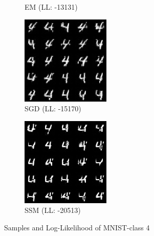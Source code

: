 \begin{figure}[H]
\begin{subfigure}[b]{0.24\textwidth}
        \caption{EM (LL: -13131)}
    \end{subfigure}
    \begin{subfigure}[b]{0.24\textwidth}
        \centering
        \includegraphics[width=\textwidth]{figures/einsum/4mnist_SGD.png} 
        \caption{SGD (LL: -15170)}
    \end{subfigure}
    \begin{subfigure}[b]{0.24\textwidth}
        \centering
        \includegraphics[width=\textwidth]{figures/einsum/4mnist_SSM.png}
        \caption{SSM (LL: -20513)}
    \end{subfigure}
    \caption{Samples and Log-Likelihood of MNIST-class 4}
\end{figure}

